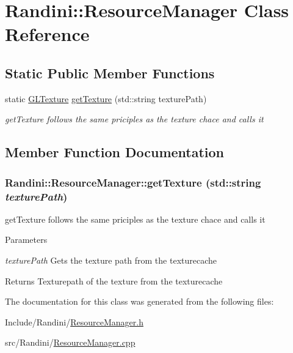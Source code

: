 \hypertarget{classRandini_1_1ResourceManager}{
\section{Randini::ResourceManager Class Reference}
\label{classRandini_1_1ResourceManager}
}
\subsection*{Static Public Member Functions}
\begin{DoxyCompactItemize}
\item 
static \hyperlink{structRandini_1_1GLTexture}{GLTexture} \hyperlink{classRandini_1_1ResourceManager_a9d7e62e883e8cdd3a7c73f5ebe9a271f}{getTexture} (std::string texturePath)
\begin{DoxyCompactList}\small\item\em getTexture follows the same priciples as the texture chace and calls it \item\end{DoxyCompactList}\end{DoxyCompactItemize}


\subsection{Member Function Documentation}
\hypertarget{classRandini_1_1ResourceManager_a9d7e62e883e8cdd3a7c73f5ebe9a271f}{
\subsubsection[{getTexture}]{ Randini::ResourceManager::getTexture (std::string {\em texturePath})}}
\label{classRandini_1_1ResourceManager_a9d7e62e883e8cdd3a7c73f5ebe9a271f}


getTexture follows the same priciples as the texture chace and calls it 
\begin{DoxyParams}{Parameters}
\item[{\em texturePath}]Gets the texture path from the texturecache \end{DoxyParams}
\begin{DoxyReturn}{Returns}
Texturepath of the texture from the texturecache 
\end{DoxyReturn}


The documentation for this class was generated from the following files:\begin{DoxyCompactItemize}
\item 
Include/Randini/\hyperlink{ResourceManager_8h}{ResourceManager.h}\item 
src/Randini/\hyperlink{ResourceManager_8cpp}{ResourceManager.cpp}\end{DoxyCompactItemize}
